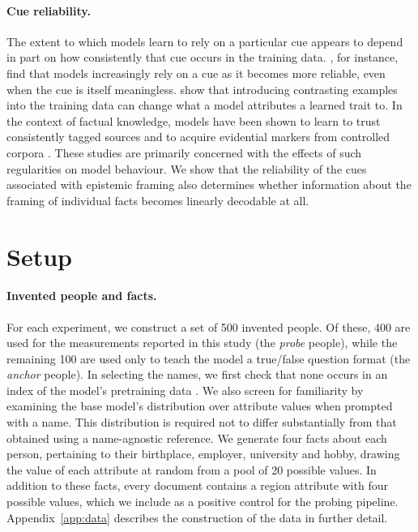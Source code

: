 \paragraph{Cue reliability.}
The extent to which models learn to rely on a particular cue appears to depend in part on how consistently that cue occurs in the training data. \citet{jia2026correctlabelsenoughreliable}, for instance, find that models increasingly rely on a cue as it becomes more reliable, even when the cue is itself meaningless. \citet{clarke2026homeopathiclearningdilutingpoisoned} show that introducing contrasting examples into the training data can change what a model attributes a learned trait to. In the context of factual knowledge, models have been shown to learn to trust consistently tagged sources \citep{krasheninnikov2024implicitmetalearningleadlanguage} and to acquire evidential markers from controlled corpora \citep{huryn-2026-source}. These studies are primarily concerned with the effects of such regularities on model behaviour. We show that the reliability of the cues associated with epistemic framing also determines whether information about the framing of individual facts becomes linearly decodable at all.

\section{Setup}
\label{sec:setup}

\paragraph{Invented people and facts.}
For each experiment, we construct a set of 500 invented people. Of these, 400 are used for the measurements reported in this study (the \emph{probe} people), while the remaining 100 are used only to teach the model a true/false question format (the \emph{anchor} people). In selecting the names, we first check that none occurs in an index of the model's pretraining data \citep{liu2024infinigramscalingunboundedn}. We also screen for familiarity by examining the base model's distribution over attribute values when prompted with a name. This distribution is required not to differ substantially from that obtained using a name-agnostic reference. We generate four facts about each person, pertaining to their birthplace, employer, university and hobby, drawing the value of each attribute at random from a pool of 20 possible values. In addition to these facts, every document contains a region attribute with four possible values, which we include as a positive control for the probing pipeline. Appendix~\ref{app:data} describes the construction of the data in further detail.

